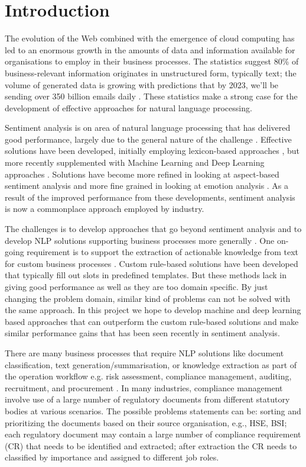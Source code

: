 \section{Introduction}
The evolution of the Web combined with the emergence of cloud computing has led to an enormous growth in the amounts of data and information available for organisations to employ in their business processes. The statistics suggest 80\% of business-relevant information originates in unstructured form, typically text; the volume of generated data is growing with predictions that by 2023, we’ll be sending over 350 billion emails daily \cite{email_site}. These statistics make a strong case for the development of effective approaches for natural language processing. 

Sentiment analysis is on area of natural language processing that has delivered good performance, largely due to the general nature of the challenge \cite{sun2019fine,yang2019xlnet}. Effective solutions have been developed, initially employing lexicon-based approaches \cite{mukras2007selecting}, but more recently supplemented with Machine Learning and Deep Learning approaches \cite{devlin2018bert}. Solutions have become more refined in looking at aspect-based sentiment analysis \cite{bandhakavi2018context} and more fine grained in looking at emotion analysis \cite{bandhakavi2017lexicon}. As a result of the improved performance from these developments, sentiment analysis is now a commonplace approach employed by industry. 

The challenges is to develop approaches that go beyond sentiment analysis and to develop NLP solutions supporting business processes more generally \cite{budek_2019}. One on-going requirement is to support the extraction of actionable knowledge from text for custom business processes \cite{Bordignon2018bpm}. Custom rule-based solutions have been developed that typically fill out slots in predefined templates. But these methods lack in giving good performance as well as they are too domain specific. By just changing the problem domain, similar kind of problems can not be solved with the same approach. In this project we hope to develop machine and deep learning based approaches that can outperform the custom rule-based solutions and make similar performance gains that has been seen recently in sentiment analysis. 

There are many business processes that require NLP solutions like document classification, text generation/summarisation, or knowledge extraction as part of the operation workflow e.g. risk assessment, compliance management, auditing, recruitment, and procurement \cite{Sintoris2017bpm}. In many industries, compliance management involve use of a large number of regulatory documents from different statutory bodies at various scenarios. The possible problems statements can be: sorting and prioritizing the documents based on their source organisation, e.g., HSE, BSI; each regulatory document may contain a large number of compliance requirement (CR) that needs to be identified and extracted; after extraction the CR needs to classified by importance and assigned to different job roles. 

